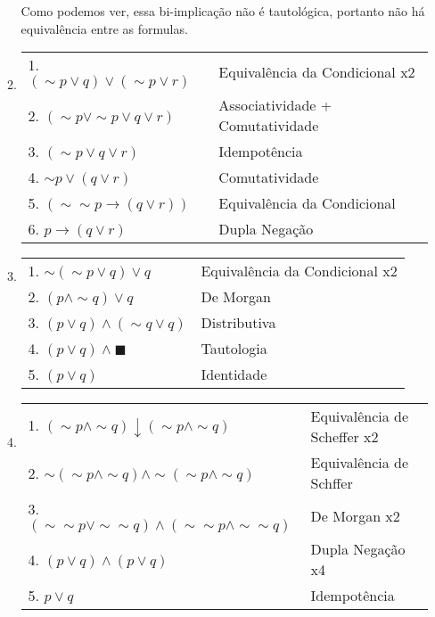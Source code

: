 \documentclass[12pt, a4paper,final]{article}
\begin{document}
\begin{enumerate}
\begin{enumerate}[label=(\alph*)]
\begin{minipage}[t]{\textwidth}
                    \vskip 5mm
                    
                    Como podemos ver, essa bi-implicação não é tautológica, portanto não há equivalência entre as formulas.

                \end{minipage}
            
            \item 
            
                \begin{tabular}{ll}
                    1. $(\sim p \vee q) \vee (\sim p \vee r)$ & Equivalência da Condicional x2 \\
                    2. $(\sim p \vee \sim p \vee q \vee r)$ & Associatividade + Comutatividade \\
                    3. $(\sim p \vee q \vee r)$ & Idempotência \\
                    4. $\sim p \vee (q \vee r)$ & Comutatividade \\
                    5. $(\sim \sim p \rightarrow (q \vee r))$ & Equivalência da Condicional \\
                    6. $p \rightarrow (q \vee r)$ & Dupla Negação 
                \end{tabular}

            \item 
            
                \begin{tabular}{ll}
                    1. $\sim(\sim p \vee q) \vee q$ & Equivalência da Condicional x2 \\
                    2. $(p \wedge \sim q) \vee q$ & De Morgan \\
                    3. $(p\vee q) \wedge (\sim q \vee q)$ & Distributiva \\
                    4. $(p \vee q) \wedge \blacksquare$ & Tautologia \\
                    5. $(p \vee q)$ & Identidade \\
                \end{tabular}
            
            \item 
            
                \begin{tabular}{ll}
                    1. $(\sim p \wedge \sim q) \downarrow (\sim p \wedge \sim q)$ & Equivalência de Scheffer x2\\
                    2. $\sim (\sim p \wedge \sim q) \wedge \sim(\sim p \wedge \sim q)$ & Equivalência de Schffer \\
                    3. $(\sim \sim p \vee \sim \sim q) \wedge (\sim \sim p \wedge \sim \sim q)$ & De Morgan x2 \\
                    4. $(p \vee q) \wedge (p \vee q)$ & Dupla Negação x4 \\
                    5. $p \vee q$ & Idempotência \\
                \end{tabular}
                

\end{enumerate}
\end{enumerate}
\end{document}
